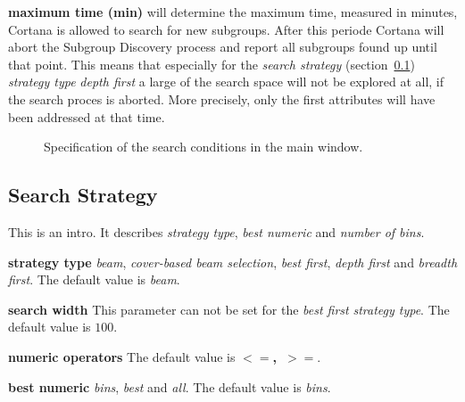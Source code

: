 \documentclass{article}
\begin{document}
\textbf{maximum time (min)} will determine the maximum time, measured in minutes, Cortana is allowed to search for new subgroups.
After this periode Cortana will abort the Subgroup Discovery process and report all subgroups found up until that point.
This means that especially for the \emph{search strategy} (section~\ref{main:search-strategy}) \emph{strategy type} \emph{depth first} a large of the search space will not be explored at all, if the search proces is aborted.
More precisely, only the first attributes will have been addressed at that time.

\begin{figure}
\begin{center}
\centering
{}
\caption{Specification of the search conditions in the main window.}
\end{center}
\label{fig:searchconditions}
\end{figure}



\subsection{Search Strategy}
\label{main:search-strategy}
This is an intro.
It describes \emph{strategy type}, \emph{best numeric} and \emph{number of bins}.

\textbf{strategy type} \emph{beam}, \emph{cover-based beam selection}, \emph{best first}, \emph{depth first} and \emph{breadth first}.
The default value is \emph{beam}.

\textbf{search width} This parameter can not be set for the \emph{best first} \emph{strategy type}.
The default value is \emph{$100$}.

\textbf{numeric operators} The default value is \mbox{\textbf{$<=$, $>=$}}.

\textbf{best numeric} \emph{bins}, \emph{best} and \emph{all}.
The default value is \emph{bins}.
\end{document}
